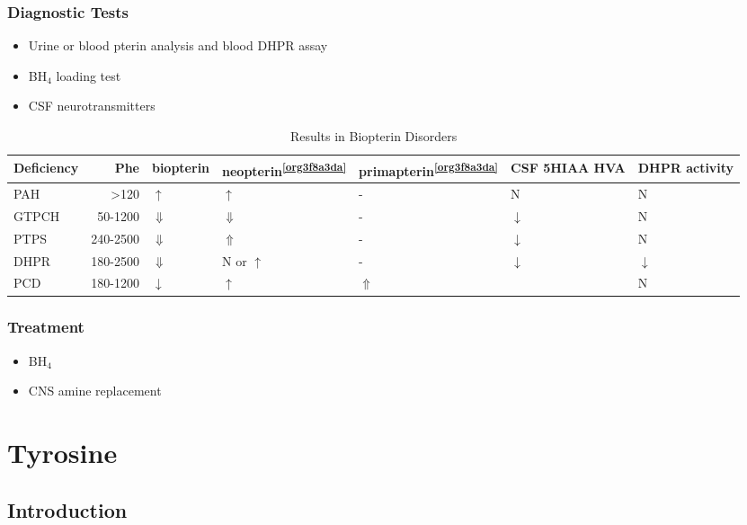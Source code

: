 \documentclass{scrartcl}
\begin{document}
\subsubsection{Diagnostic Tests}
\label{sec:org7a851a8}
\begin{itemize}
\item Urine or blood pterin analysis and blood DHPR assay
\item BH\(_{\text{4}}\) loading test
\item CSF neurotransmitters
\end{itemize}

\begin{table}[htbp]
\caption{\label{tab:org6160354}
Results in Biopterin Disorders}
\centering
\begin{tabular}{lrlllll}
Deficiency & Phe & biopterin\footnotemark & neopterin\textsuperscript{\ref{org3f8a3da}} & primapterin\textsuperscript{\ref{org3f8a3da}} & CSF 5HIAA HVA & DHPR activity\\
\hline
PAH & \textgreater{}120 & \(\uparrow\) & \(\uparrow\) & - & N & N\\
GTPCH & 50-1200 & \(\Downarrow\) & \(\Downarrow\) & - & \(\downarrow\) & N\\
PTPS & 240-2500 & \(\Downarrow\) & \(\Uparrow\) & - & \(\downarrow\) & N\\
DHPR & 180-2500 & \(\Downarrow\) & N or \(\uparrow\) & - & \(\downarrow\) & \(\downarrow\)\\
PCD & 180-1200 & \(\downarrow\) & \(\uparrow\) & \(\Uparrow\) &  & N\\
\end{tabular}
\end{table}

\subsubsection{Treatment}
\label{sec:org13322ec}
\begin{itemize}
\item BH\(_{\text{4}}\)
\item CNS amine replacement
\end{itemize}

\section{Tyrosine}
\label{sec:orgdc011bb}
\subsection{Introduction}
\label{sec:org1cb05b5}
\end{document}
